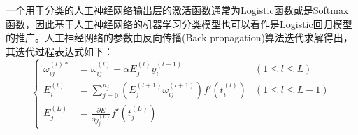 \documentclass[a4paper]{ctexart}
\begin{document}
一个用于分类的人工神经网络输出层的激活函数通常为Logistic函数或是Softmax函数，因此基于人工神经网络的机器学习分类模型也可以看作是Logistic回归模型的推广。人工神经网络的参数由反向传播(Back propagation)算法迭代求解得出，其迭代过程表达式如下\cite{RN2}：
\begin{equation}
	\left\{
	\begin{aligned}
		\omega_{ij}^{(l)*} & =\omega_{ij}^{(l)}-\alpha E_j^{(l)}y_i^{(l-1)}                                         & (1\leq l\leq L)   \\
		E_i^{(l)}          & =\sum_{j=0}^{n_{j}}\left(E_j^{(l+1)}\omega_{ij}^{(l+1)}\right)f'\left(t_i^{(l)}\right) & (1\leq l\leq L-1) \\
		E_j^{(L)}          & =\frac{\partial E}{\partial y_j^{(L)}}f'\left(t_j^{(L)}\right)                         &
	\end{aligned}
	\right.
\end{equation}
\end{document}

